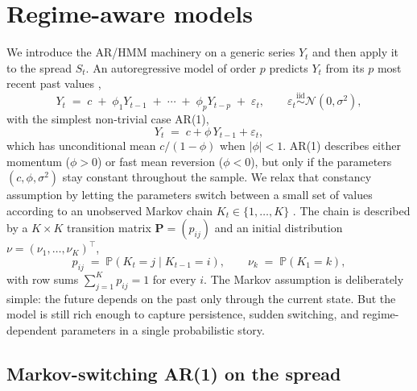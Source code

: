 
\section{Regime-aware models}\label{sec:regimemodels}

We introduce the AR/HMM machinery on a generic series $Y_t$ and then apply it to the spread $S_t$. An autoregressive model of order $p$ predicts $Y_t$ from its $p$ most recent past values \parencite{hamilton1994},
\begin{equation}\label{eq:arp}
    Y_t \;=\; c \;+\; \phi_{1} Y_{t-1} \;+\; \cdots \;+\; \phi_{p} Y_{t-p} \;+\; \varepsilon_t, \qquad \varepsilon_t \overset{\mathrm{iid}}{\sim} \mathcal{N}(0,\sigma^{2}),
\end{equation}
with the simplest non-trivial case AR(1),
\begin{equation}\label{eq:ar1}
    Y_t \;=\; c + \phi\, Y_{t-1} + \varepsilon_t,
\end{equation}
which has unconditional mean $c/(1-\phi)$ when $|\phi|<1$. AR(1) describes either momentum ($\phi > 0$) or fast mean reversion ($\phi < 0$), but only if the parameters $(c,\phi,\sigma^{2})$ stay constant throughout the sample. We relax that constancy assumption by letting the parameters switch between a small set of values according to an unobserved Markov chain $K_t \in \{1,\ldots,K\}$ \parencite{hamilton1989new}. The chain is described by a $K \times K$ transition matrix $\mathbf{P} = (p_{ij})$ and an initial distribution $\nu = (\nu_1,\ldots,\nu_K)^{\top}$,
\begin{equation}\label{eq:transitionmatrix}
    p_{ij} \;=\; \mathbb{P}(K_t = j \mid K_{t-1} = i),
    \qquad
    \nu_k \;=\; \mathbb{P}(K_1 = k),
\end{equation}
with row sums $\sum_{j=1}^{K} p_{ij} = 1$ for every $i$. The Markov assumption is deliberately simple: the future depends on the past only through the current state. But the model is still rich enough to capture persistence, sudden switching, and regime-dependent parameters in a single probabilistic story.

\subsection{Markov-switching AR(1) on the spread}\label{sec:msarspread}

